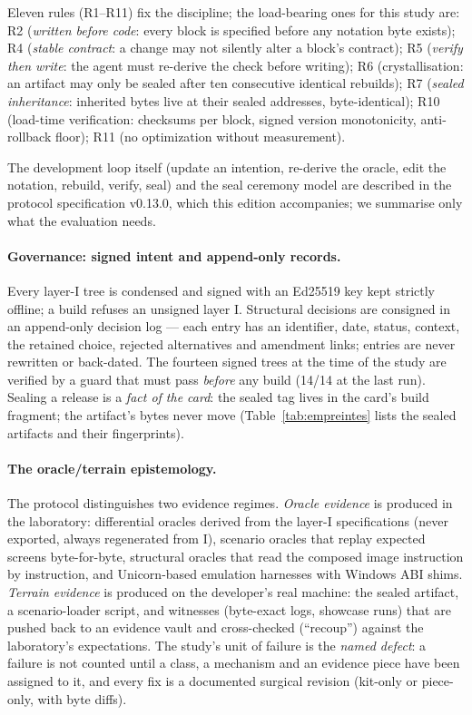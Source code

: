 \documentclass[11pt,a4paper]{article}
\begin{document}
Eleven rules (R1--R11) fix the discipline; the load-bearing ones for this
study are: R2 (\emph{written before code}: every block is specified before
any notation byte exists); R4 (\emph{stable contract}: a change may not
silently alter a block's contract); R5 (\emph{verify then write}: the
agent must re-derive the check before writing); R6 (crystallisation: an
artifact may only be sealed after ten consecutive identical rebuilds);
R7 (\emph{sealed inheritance}: inherited bytes live at their sealed
addresses, byte-identical); R10 (load-time verification: checksums per
block, signed version monotonicity, anti-rollback floor); R11 (no
optimization without measurement).

The development loop itself (update an intention, re-derive the oracle,
edit the notation, rebuild, verify, seal) and the seal ceremony model are
described in the protocol specification v0.13.0, which this edition
accompanies; we summarise only what the evaluation needs.

\paragraph{Governance: signed intent and append-only records.}
Every layer-I tree is condensed and signed with an Ed25519 key kept
strictly offline; a build refuses an unsigned layer I. Structural
decisions are consigned in an append-only decision log --- each entry has
an identifier, date, status, context, the retained choice, rejected
alternatives and amendment links; entries are never rewritten or
back-dated. The fourteen signed trees at the time of the study are verified
by a guard that must pass \emph{before} any build (14/14 at the last
run). Sealing a release is a \emph{fact of the card}: the sealed tag
lives in the card's build fragment; the artifact's bytes never move
(Table~\ref{tab:empreintes} lists the sealed artifacts and their
fingerprints).

\paragraph{The oracle/terrain epistemology.}
The protocol distinguishes two evidence regimes. \emph{Oracle evidence} is
produced in the laboratory: differential oracles derived from the layer-I
specifications (never exported, always regenerated from I), scenario
oracles that replay expected screens byte-for-byte, structural oracles
that read the composed image instruction by instruction, and Unicorn-based
emulation harnesses with Windows ABI shims. \emph{Terrain evidence} is
produced on the developer's real machine: the sealed artifact, a
scenario-loader script, and witnesses (byte-exact logs, showcase runs)
that are pushed back to an evidence vault and cross-checked (``recoup'')
against the laboratory's expectations. The study's unit of failure is the
\emph{named defect}: a failure is not counted until a class, a mechanism
and an evidence piece have been assigned to it, and every fix is a
documented surgical revision (kit-only or piece-only, with byte diffs).
\end{document}
